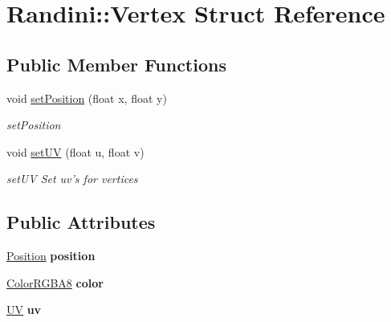 \hypertarget{structRandini_1_1Vertex}{
\section{Randini::Vertex Struct Reference}
\label{structRandini_1_1Vertex}
}
\subsection*{Public Member Functions}
\begin{DoxyCompactItemize}
\item 
void \hyperlink{structRandini_1_1Vertex_ad00ffb3af37c668d40f28ae2d8cce41b}{setPosition} (float x, float y)
\begin{DoxyCompactList}\small\item\em setPosition \item\end{DoxyCompactList}\item 
void \hyperlink{structRandini_1_1Vertex_a1433f80829a7d1c3486ac9ef669e3e76}{setUV} (float u, float v)
\begin{DoxyCompactList}\small\item\em setUV Set uv's for vertices \item\end{DoxyCompactList}\end{DoxyCompactItemize}
\subsection*{Public Attributes}
\begin{DoxyCompactItemize}
\item 
\hypertarget{structRandini_1_1Vertex_ae5335415f2c18745710786492093b37c}{
\hyperlink{structRandini_1_1Position}{Position} {\bfseries position}}
\label{structRandini_1_1Vertex_ae5335415f2c18745710786492093b37c}

\item 
\hypertarget{structRandini_1_1Vertex_a47ba3de5e86302c30d50051d840cd4a9}{
\hyperlink{structRandini_1_1ColorRGBA8}{ColorRGBA8} {\bfseries color}}
\label{structRandini_1_1Vertex_a47ba3de5e86302c30d50051d840cd4a9}

\item 
\hypertarget{structRandini_1_1Vertex_a72d59c20270fb7777ae6e0457fe6d1b9}{
\hyperlink{structRandini_1_1UV}{UV} {\bfseries uv}}
\label{structRandini_1_1Vertex_a72d59c20270fb7777ae6e0457fe6d1b9}

\end{DoxyCompactItemize}


